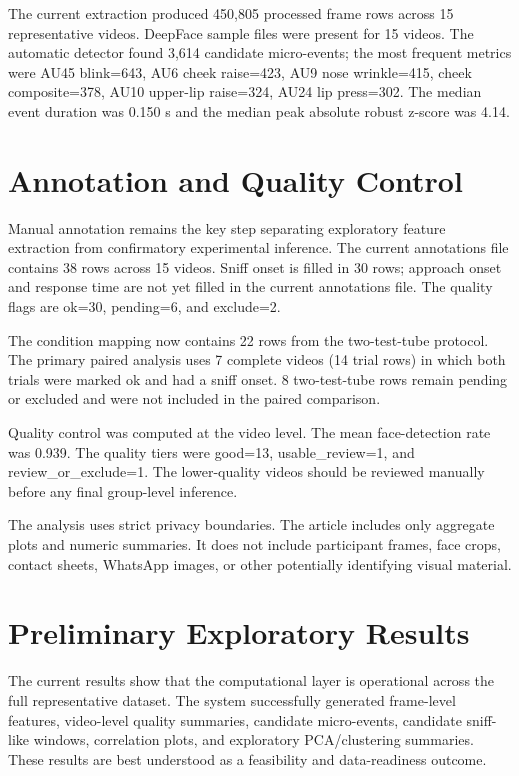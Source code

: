 \documentclass[11pt]{article}
\begin{document}
The current extraction produced 450,805 processed frame rows across 15 representative videos. DeepFace sample files were present for 15 videos. The automatic detector found 3,614 candidate micro-events; the most frequent metrics were AU45 blink=643, AU6 cheek raise=423, AU9 nose wrinkle=415, cheek composite=378, AU10 upper-lip raise=324, AU24 lip press=302. The median event duration was 0.150 s and the median peak absolute robust z-score was 4.14.

\section{Annotation and Quality Control}
Manual annotation remains the key step separating exploratory feature extraction from confirmatory experimental inference. The current annotations file contains 38 rows across 15 videos. Sniff onset is filled in 30 rows; approach onset and response time are not yet filled in the current annotations file. The quality flags are ok=30, pending=6, and exclude=2.

The condition mapping now contains 22 rows from the two-test-tube protocol. The primary paired analysis uses 7 complete videos (14 trial rows) in which both trials were marked ok and had a sniff onset. 8 two-test-tube rows remain pending or excluded and were not included in the paired comparison.

Quality control was computed at the video level. The mean face-detection rate was 0.939. The quality tiers were good=13, usable\_review=1, and review\_or\_exclude=1. The lower-quality videos should be reviewed manually before any final group-level inference.

The analysis uses strict privacy boundaries. The article includes only aggregate plots and numeric summaries. It does not include participant frames, face crops, contact sheets, WhatsApp images, or other potentially identifying visual material.

\section{Preliminary Exploratory Results}
The current results show that the computational layer is operational across the full representative dataset. The system successfully generated frame-level features, video-level quality summaries, candidate micro-events, candidate sniff-like windows, correlation plots, and exploratory PCA/clustering summaries. These results are best understood as a feasibility and data-readiness outcome.
\end{document}
